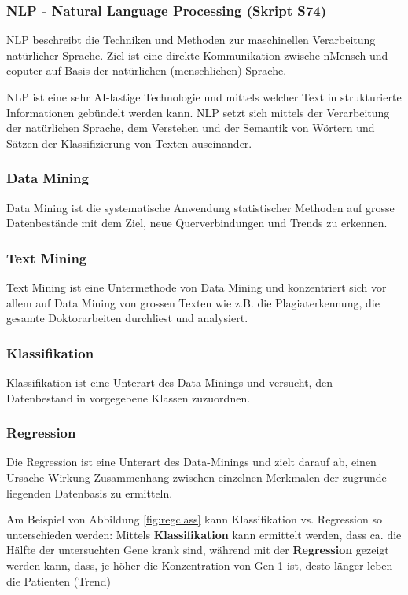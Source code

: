 \documentclass[a4paper, 11pt, nofootinbib]{article}
\begin{document}
\subsubsection{NLP - Natural Language Processing (Skript S74)}
 NLP beschreibt die Techniken und Methoden zur maschinellen Verarbeitung natürlicher Sprache. Ziel ist eine direkte Kommunikation zwische nMensch und coputer auf Basis der natürlichen (menschlichen) Sprache.

NLP ist eine sehr AI-lastige Technologie und mittels welcher Text in strukturierte Informationen gebündelt werden kann. NLP setzt sich mittels der Verarbeitung der natürlichen Sprache, dem Verstehen und der Semantik von 
Wörtern und Sätzen der Klassifizierung von Texten auseinander.

\subsubsection{Data Mining}
 Data Mining ist die systematische Anwendung statistischer Methoden auf grosse Datenbestände mit dem Ziel, neue Querverbindungen und Trends zu erkennen.

\subsubsection{Text Mining}
 Text Mining ist eine Untermethode von Data Mining und konzentriert sich vor allem auf Data Mining von grossen Texten wie z.B. die Plagiaterkennung, die gesamte Doktorarbeiten durchliest und analysiert.
 
 \subsubsection{Klassifikation}
 Klassifikation ist eine Unterart des Data-Minings und versucht, den Datenbestand in vorgegebene Klassen zuzuordnen.
 
 \subsubsection{Regression}
 Die Regression ist eine Unterart des Data-Minings und zielt darauf ab, einen Ursache-Wirkung-Zusammenhang zwischen einzelnen Merkmalen der zugrunde liegenden Datenbasis zu ermitteln. 
 
 Am Beispiel von Abbildung \ref{fig:regclass} kann Klassifikation vs. Regression so unterschieden werden: Mittels \textbf{Klassifikation} kann ermittelt werden, dass ca. die Hälfte der untersuchten Gene krank sind, während mit der \textbf{Regression} gezeigt werden kann, dass, je höher die Konzentration von Gen 1 ist, desto länger leben die Patienten (Trend)
 
\end{document}
